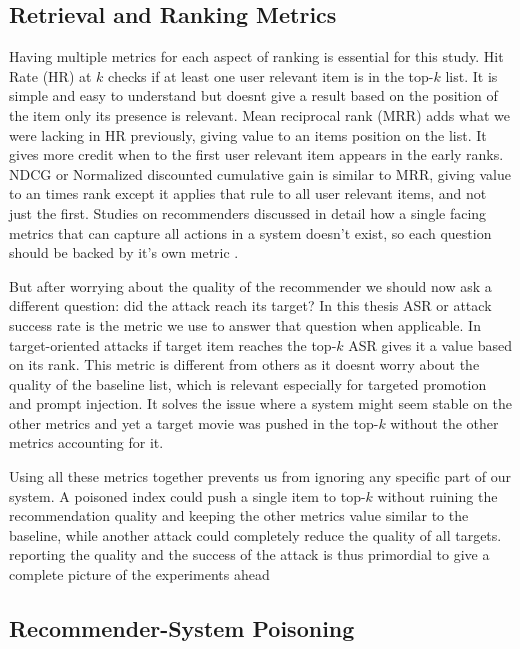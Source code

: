 \subsection{Retrieval and Ranking Metrics}

Having multiple metrics for each aspect of ranking is essential for this study. Hit Rate (HR) at $k$ checks if at least one user relevant item is in the top-$k$ list. It is simple and easy to understand but doesnt give a result based on the position of the item only its presence is relevant. Mean reciprocal rank (MRR) adds what we were lacking in HR previously, giving value to an items position on the list. It gives more credit when to the first user relevant item appears in the early ranks. NDCG or Normalized discounted cumulative gain is similar to MRR, giving value to an times rank except it applies that rule to all user relevant items, and not just the first. Studies on recommenders discussed in detail how a single facing metrics that can capture all actions in a system doesn't exist, so each question should be backed by it's own metric \cite{herlocker2004evaluating}.

But after worrying about the quality of the recommender we should now ask a different question: did the attack reach its target? In this thesis ASR or attack success rate is the metric we use to answer that question when applicable. In target-oriented attacks if target item reaches the top-$k$ ASR gives it a value based on its rank. This metric is different from others as it doesnt worry about the quality of the baseline list, which is relevant especially for targeted promotion and prompt injection. It solves the issue where a system might seem stable on the other metrics and yet a target movie was pushed in the top-$k$ without the other metrics accounting for it.  

Using all these metrics together prevents us from ignoring any specific part of our system. A poisoned index could push a single item to top-$k$ without ruining the recommendation quality and keeping the other metrics value similar to the baseline, while another attack could completely  reduce the quality of all targets. reporting the quality and the success of the attack is thus primordial to give a complete picture of the experiments ahead

\subsection{Recommender-System Poisoning}

